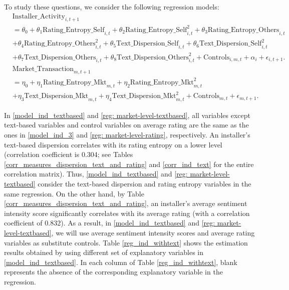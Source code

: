 \documentclass[msom,blindrev]{informs3}
\begin{document}
	
	To study these questions, we consider the following regression models:
	\begin{align}  \nonumber
	& \text{Installer\_Activity}_{i,t+1} \\ \nonumber
	& = \theta_{0}+ \theta_{1} \text{Rating\_Entropy\_Self}_{i,t}+ \theta_{2} \text{Rating\_Entropy\_Self}_{i,t}^ {2} + \theta_{3} \text{Rating\_Entropy\_Others}_{i,t} \\ \nonumber
	& + \theta_{4} \text{Rating\_Entropy\_Others}_{i,t}^{2} + \theta_{5} \text{Text\_Dispersion\_Self}_{i,t}+  \theta_{6}  \text{Text\_Dispersion\_Self}_{i,t}^ {2}  \\ \label{model_ind_textbased}
	&+ \theta_{7}  \text{Text\_Dispersion\_Others}_{i,t} + \theta_{8} \text{Text\_Dispersion\_Others}_{i,t}^{2}  + \text{Controls}_{i,m,t}+ \alpha_{i} + \epsilon_{i,t+1}.\\ \nonumber
	& \text{Market\_Transaction}_{m,t+1} \\ \nonumber
	& =  \eta_{0} + \eta_{1} \text{Rating\_Entropy\_Mkt}_{m,t}+  \eta_{2} \text{Rating\_Entropy\_Mkt}_{m,t}^2 \\ \label{reg: market-level-textbased}
	&+ \eta_{3} \text{Text\_Dispersion\_Mkt}_{m,t}+ \eta_{4} \text{Text\_Dispersion\_Mkt}_{m,t}^2  + \text{Controls}_{m,t}  + \epsilon_{m,t+1}.
	\end{align}
	
	In \eqref{model_ind_textbased} and \eqref{reg: market-level-textbased}, all variables except text-based variables and control variables on average rating are the same as the ones in \eqref{model_ind_3} and \eqref{reg: market-level-rating}, respectively. An installer's text-based dispersion correlates with its rating entropy on a lower level (correlation coefficient is 0.304; see Tables \ref{corr_measures_dispersion_text_and_rating} and \ref{corr_ind_text} for the entire correlation matrix). Thus, \eqref{model_ind_textbased} and \eqref{reg: market-level-textbased} consider the text-based dispersion and rating entropy variables in the same regression. On the other hand, by Table \ref{corr_measures_dispersion_text_and_rating}, an installer's average sentiment intensity score significantly correlates with its average rating (with a correlation coefficient of 0.832). As a result, in \eqref{model_ind_textbased} and \eqref{reg: market-level-textbased},  we will use average sentiment intensity scores and average rating variables as substitute controls. Table \ref{reg_ind_withtext} shows the estimation results obtained by using different set of explanatory variables in \eqref{model_ind_textbased}. In each column of Table \ref{reg_ind_withtext}, blank represents the absence of the corresponding explanatory variable in the regression.
	
\end{document}
